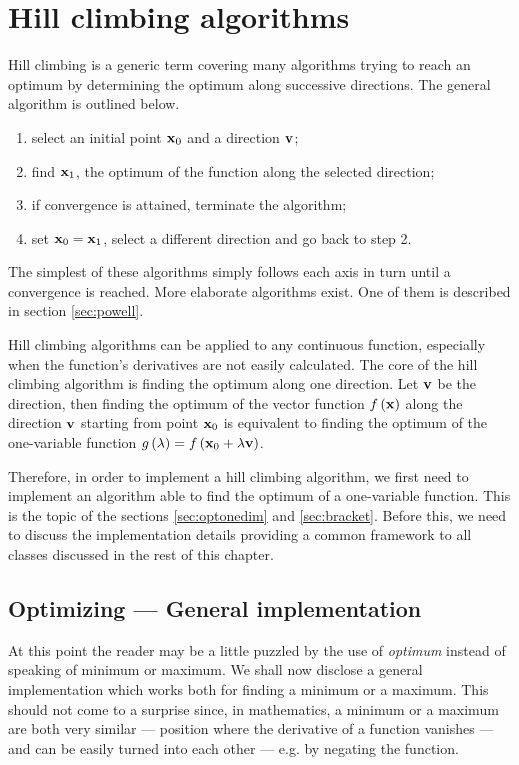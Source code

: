 \documentclass[twoside]{book}
\begin{document}
\section{Hill climbing algorithms}
Hill climbing is a generic term covering many algorithms trying to
reach an optimum by determining the optimum along successive
directions. The general algorithm is outlined below.
\begin{enumerate}
  \item select an initial point ${\bf x}_0$ and a direction ${\bf v}$;
  \item find ${\bf x}_1$, the optimum of the function along the selected
  direction;
  \item if convergence is attained, terminate the algorithm;
  \item set ${\bf x}_0={\bf x}_1$, select a different direction and go back to step 2.
\end{enumerate}
The simplest of these algorithms simply follows each axis in turn
until a convergence is reached. More elaborate algorithms
exist\cite{Press}. One of them is described in section
\ref{sec:powell}.

Hill climbing algorithms can be applied to any continuous
function, especially when the function's derivatives are not
easily calculated. The core of the hill climbing algorithm is
finding the optimum along one direction. Let ${\bf v}$ be the
direction, then finding the optimum of the vector function
$f\left({\bf x}\right)$ along the direction ${\bf v}$ starting
from point ${\bf x}_0$ is equivalent to finding the optimum of the
one-variable function $g\left(\lambda\right)=f\left({\bf
x}_0+\lambda{\bf v}\right)$.

Therefore, in order to implement a hill climbing algorithm, we
first need to implement an algorithm able to find the optimum of a
one-variable function. This is the topic of the sections
\ref{sec:optonedim} and \ref{sec:bracket}. Before this, we need to
discuss the implementation details providing a common framework to
all classes discussed in the rest of this chapter.

\subsection{Optimizing --- General implementation}
\label{sec:goptonedim} At this point the reader may be a little
puzzled by the use of {\sl optimum} instead of speaking of minimum
or maximum. We shall now disclose a general implementation which
works both for finding a minimum or a maximum. This should not
come to a surprise since, in mathematics, a minimum or a maximum
are both very similar --- position where the derivative of a
function vanishes
--- and can be easily turned into each other --- e.g. by negating the
function.
\end{document}
